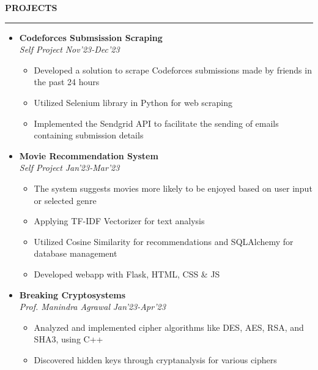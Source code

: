 \documentclass[9pt]{article}
\newcommand{\header}[1]{
	\par\addvspace{0.6cm}%
	{\Large{\textbf{\MakeUppercase{#1}}}}%
	\par\addvspace{0.3cm}%
	\hrule%
	\par\addvspace{0.3cm}%
}
\begin{document}
\hspace{10mm}%
\begin{minipage}[t]{0.447\textwidth}


	\header{projects}
	
	\begin{itemize}[label={}, left=0pt]
		\item \textbf{Codeforces Submsission Scraping} \hfill \href{https://github.com/AakibAlam/codeforces-submission-scraping}{\faGithub}\\
		\textit{Self Project} \hfill \textit{Nov'23-Dec'23}
		\vspace{-1mm}
		\begin{itemize}[label={\textbullet}, left=0pt]
			\item Developed a solution to scrape Codeforces submissions made by friends in the past 24 hours
			\item Utilized Selenium library in Python for web scraping
			\item Implemented the Sendgrid API to facilitate the sending of emails containing submission details
		\end{itemize}%
		
			\item \textbf{Movie Recommendation System} \hfill \href{https://github.com/AakibAlam/movie-recommender-system}{\faGithub}\\
			\textit{Self Project} \hfill \textit{Jan'23-Mar'23}
			\vspace{-1mm}
			\begin{itemize}[label={\textbullet}, left=0pt]
				\item The system suggests movies more likely to be enjoyed based on user input or selected genre
				\item Applying TF-IDF Vectorizer for text analysis
				\item Utilized Cosine Similarity for recommendations and SQLAlchemy for database management
				\item Developed webapp with Flask, HTML, CSS \& JS
			\end{itemize}
			
			\item \textbf{Breaking Cryptosystems} \hfill \href{https://github.com/AakibAlam/breaking-cryptosystems}{\faGithub}\\
			\textit{Prof. Manindra Agrawal} \hfill \textit{Jan'23-Apr'23}
			\vspace{-1mm}
			\begin{itemize}[label={\textbullet}, left=0pt]
				\item Analyzed and implemented cipher algorithms like DES, AES, RSA, and SHA3, using C++
				\item Discovered hidden keys through cryptanalysis for various ciphers
			\end{itemize}
			

\end{itemize}
\end{minipage}
\end{document}

